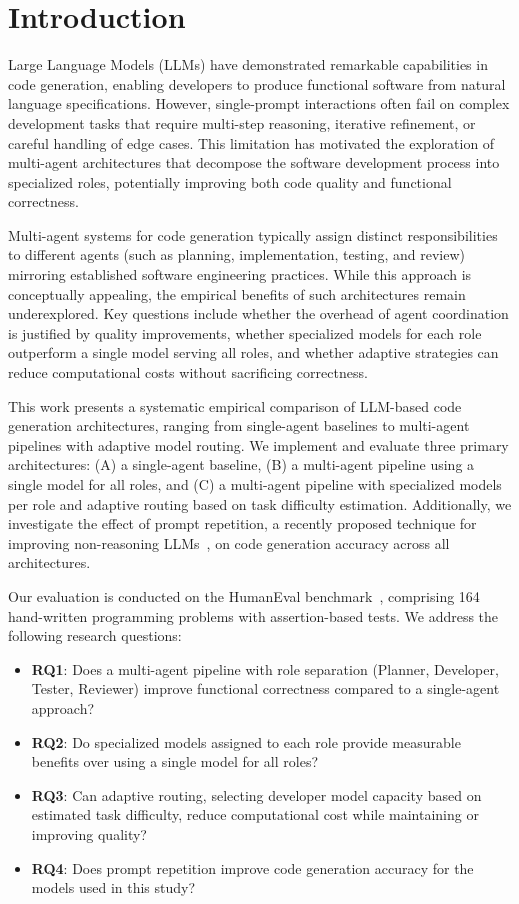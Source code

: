\section{Introduction}
\label{sec:introduction}

Large Language Models (LLMs) have demonstrated remarkable capabilities in code generation, enabling developers to produce functional software from natural language specifications. However, single-prompt interactions often fail on complex development tasks that require multi-step reasoning, iterative refinement, or careful handling of edge cases. This limitation has motivated the exploration of multi-agent architectures that decompose the software development process into specialized roles, potentially improving both code quality and functional correctness.

Multi-agent systems for code generation typically assign distinct responsibilities to different agents (such as planning, implementation, testing, and review) mirroring established software engineering practices. While this approach is conceptually appealing, the empirical benefits of such architectures remain underexplored. Key questions include whether the overhead of agent coordination is justified by quality improvements, whether specialized models for each role outperform a single model serving all roles, and whether adaptive strategies can reduce computational costs without sacrificing correctness.

This work presents a systematic empirical comparison of LLM-based code generation architectures, ranging from single-agent baselines to multi-agent pipelines with adaptive model routing. We implement and evaluate three primary architectures: (A) a single-agent baseline, (B) a multi-agent pipeline using a single model for all roles, and (C) a multi-agent pipeline with specialized models per role and adaptive routing based on task difficulty estimation. Additionally, we investigate the effect of prompt repetition, a recently proposed technique for improving non-reasoning LLMs~\cite{leviathan2025prompt}, on code generation accuracy across all architectures.

Our evaluation is conducted on the HumanEval benchmark~\cite{chen2021humaneval}, comprising 164 hand-written programming problems with assertion-based tests. We address the following research questions:

\begin{itemize}
    \item \textbf{RQ1}: Does a multi-agent pipeline with role separation (Planner, Developer, Tester, Reviewer) improve functional correctness compared to a single-agent approach?
    \item \textbf{RQ2}: Do specialized models assigned to each role provide measurable benefits over using a single model for all roles?
    \item \textbf{RQ3}: Can adaptive routing, selecting developer model capacity based on estimated task difficulty, reduce computational cost while maintaining or improving quality?
    \item \textbf{RQ4}: Does prompt repetition improve code generation accuracy for the models used in this study?
\end{itemize}

